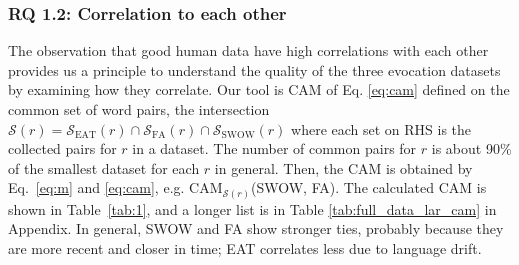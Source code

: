 \documentclass[letterpaper]{article} %
\begin{document}
\subsubsection{RQ 1.2: Correlation to each other}
\label{sec:correlation}
The observation that good human data have high correlations with each other \cite{miller1991contextual, Resnik:1995:UIC:1625855.1625914} provides us a principle to understand the quality of the three evocation datasets by examining how they correlate. Our tool is CAM of Eq. \ref{eq:cam} defined on the common set of word pairs, the intersection $\mathcal{S}(r)=\mathcal{S}_{\text{EAT}}(r) \cap \mathcal{S}_{\text{FA}}(r) \cap \mathcal{S}_{\text{SWOW}}(r)$ where each set on RHS is the collected pairs for $r$ in a dataset. The number of common pairs for $r$ is about 90\% of the smallest dataset for each $r$ in general. Then, the CAM is obtained by Eq.~\ref{eq:m} and \ref{eq:cam}, e.g. CAM$_{\mathcal{S}(r)}$(SWOW, FA). The calculated CAM is shown in Table~\ref{tab:1}, and a longer list is in Table \ref{tab:full_data_lar_cam} in Appendix. In general, SWOW and FA show stronger ties, probably because they are more recent and closer in time; EAT correlates less due to language drift.
\end{document}
